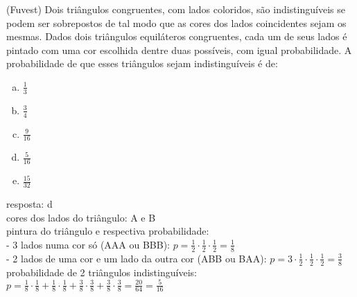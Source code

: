 \begin{ex}
 (Fuvest) Dois triângulos congruentes, com lados coloridos, são indistinguíveis se podem ser sobrepostos de tal modo que as cores dos lados coincidentes sejam os mesmas. 
Dados dois triângulos equiláteros congruentes, cada um de seus lados é pintado com uma cor escolhida dentre duas possíveis, com igual probabilidade.  
A probabilidade de que esses triângulos sejam indistinguíveis é de: 
    \begin{enumerate}[(a)]
    \item $\frac{1}{3}$
    \item $\frac{3}{4}$
    \item $\frac{9}{16}$
    \item $\frac{5}{16}$
    \item $\frac{15}{32}$
    \end{enumerate}
     \begin{sol}
     resposta: d \\
     cores dos lados do triângulo: A e B \\
     pintura do triângulo e respectiva probabilidade:\\
      - 3 lados numa cor só (AAA ou BBB): $p=\frac{1}{2}\cdot\frac{1}{2}\cdot\frac{1}{2}=\frac{1}{8}$ \\
      - 2 lados de uma cor e um lado da outra cor (ABB ou BAA): $p=3\cdot\frac{1}{2}\cdot\frac{1}{2}\cdot\frac{1}{2}=\frac{3}{8}$ \\
     probabilidade de 2 triângulos indistinguíveis: \\ $p=\frac{1}{8}\cdot\frac{1}{8}+\frac{1}{8}\cdot\frac{1}{8}+\frac{3}{8}\cdot\frac{3}{8}+\frac{3}{8}\cdot\frac{3}{8}=\frac{20}{64}=\frac{5}{16}$
     \end{sol}
\end{ex}